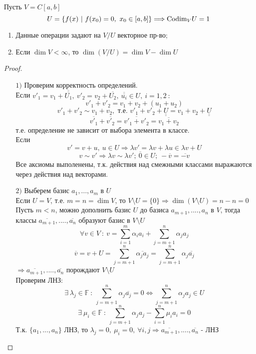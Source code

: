     \begin{example1}
        Пусть $V = C[a, b]$ 
        $$U = \{f(x) \ | \ f(x_0) = 0, \ x_0 \in [a, b]\} \Longrightarrow \textup{Codim}_{V} U = 1$$
    \end{example1}
    \begin{theorem} \tab
        \begin{enumerate}
            \item Данные операции задают на $V/U$ векторное пр-во;
            \item Если $\dim V < \infty$, то $\dim(V/U) = \dim V - \dim U$
        \end{enumerate}
    \end{theorem}
    \begin{proof} \tab
        \begin{itemize}
            \item[$1)$] Проверим корректность определений.\\
            Если $v'_1 = v_1 + \overline{\overline{U_1}}, \ v'_2 = v_2 + \overline{U_2}, \ \overline{\overline{u_i}}\in U, \ i =1, 2 \ : $ 
            $$v'_1 + v'_2 = v_1 + v_2 + (u_1 + u_2)$$
            $$ v'_1 + v'_2 \sim v_1 + v_2, \text{ т.е. } v'_1 + v'_2 + \underline{\underline{U}} = v_1 + v_2 + \underline{\underline{U}} $$
            $$\overline{v'_1} + \overline{v'_2} = \overline{v'_1 + v'_2} = \overline{v_1 + v_2}$$
            т.е. определение не зависит от выбора элемента в классе.\\
            Если 
            $$v' = v + u, \ u \in U \Longrightarrow \lambda v' = \lambda v + \lambda u \in \lambda v + U$$ 
            $$v \sim v' \Longrightarrow \lambda v \sim \lambda v'; \ \overline{0} \in U; \  -\overline{v} = \overline{-v}$$
            Все аксиомы выполенены, т.к. действия над смежными классами выражаются через действия над векторами.
            \item[$2)$] Выберем базис $a_1,...,a_m$ в $U$\\
            Если $U=V$, т.е. $m=n=\dim V$, то $V\setminus U = \{0\} \Longrightarrow \dim (V\setminus U) = n-n=0$\\
            Пусть $m<n$,  можно дополнить базис $U$ до базиса $a_{m+1},....,a_n$ в $V$, тогда классы $\overline{a_{m+1}},....,\overline{a_n}$ образуют базис в $V\setminus U$
            $$\forall v \in V \ : \ v = \sum \limits_{i=1}^m \alpha_i a_i + \sum \limits_{j=m+1}^n \alpha_j a_j$$
            $$\overline{v} = v+ U = \sum \limits_{j=m+1}^n \overline{\alpha_j a_j} = \sum \limits_{j=m+1}^n \alpha_j \overline{ a_j}$$
            $\Longrightarrow \overline{a_{m+1}},....,\overline{a_n}$ порождают $V\setminus U$\\
            Проверим ЛНЗ: 
            $$\exists \ \lambda_j \in \mathbb{F} \ : \ \sum \limits_{j=m+1}^n \alpha_j \overline{ a_j} = 0 \Longleftrightarrow  \sum \limits_{j=m+1}^n \alpha_j a_j \in U$$
            $$\exists \ \mu_i \in \mathbb{F} \ : \ \sum \limits_{j=m+1}^n \alpha_j a_j - \sum \limits_{i=1}^n \mu_i a_i = 0$$
            Т.к. $\{a_1,...,a_n\}$ ЛНЗ, то $\lambda_j =0, \ \mu_i =0 , \ \forall i,j \Longrightarrow \overline{a_{m+1}},....,\overline{a_n}$ - ЛНЗ   
        \end{itemize}
    \end{proof}